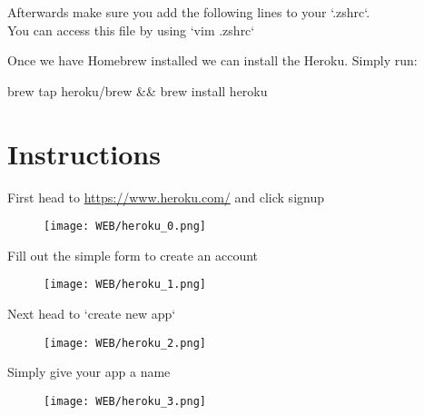 \documentclass{42-en}
\begin{document}
Afterwards make sure you add the following lines to your `.zshrc`.\\
You can access this file by using `vim .zshrc`

Once we have Homebrew installed we can install the Heroku. Simply run:
\begin{42console}
    brew tap heroku/brew && brew install heroku
\end{42console}


\newpage
\chapter{Instructions}

First head to \href{https://www.heroku.com/}{https://www.heroku.com/} and click signup

\begin{figure}[H]
    \begin{center}
        \texttt{[image: WEB/heroku\_0.png]}
    \end{center}
\end{figure}

\newpage
Fill out the simple form to create an account
\begin{figure}[H]
    \begin{center}
        \texttt{[image: WEB/heroku\_1.png]}
    \end{center}
\end{figure}

\newpage

Next head to `create new app`
\begin{figure}[H]
    \begin{center}
        \texttt{[image: WEB/heroku\_2.png]}
    \end{center}
\end{figure}

Simply give your app a name
\begin{figure}[H]
    \begin{center}
        \texttt{[image: WEB/heroku\_3.png]}
    \end{center}
\end{figure}
\end{document}
